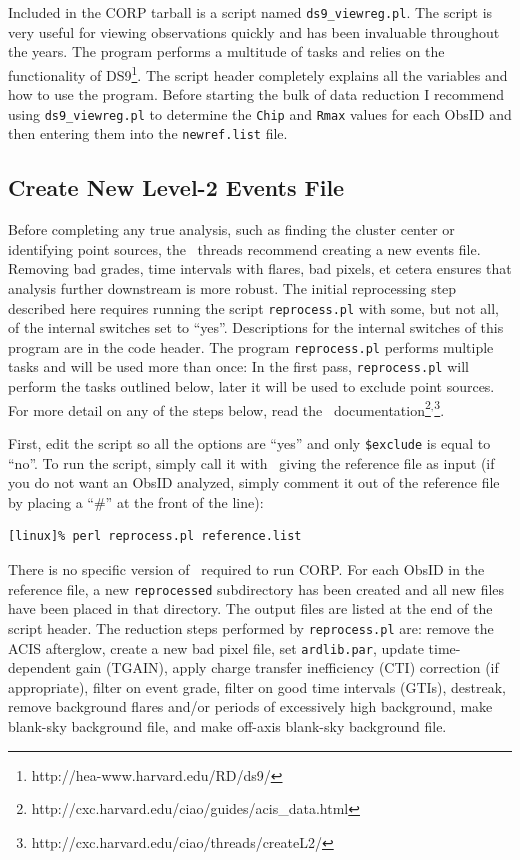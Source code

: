 Included in the CORP tarball is a script named
{\tt{ds9\_viewreg.pl}}. The script is very useful for viewing
observations quickly and has been invaluable throughout the years. The
program performs a multitude of tasks and relies on the functionality
of DS9\footnote{http://hea-www.harvard.edu/RD/ds9/}. The script header
completely explains all the variables and how to use the
program. Before starting the bulk of data reduction I recommend using
{\tt{ds9\_viewreg.pl}} to determine the {\tt{Chip}} and {\tt{Rmax}}
values for each ObsID and then entering them into the
{\tt{newref.list}} file.

\subsection{Create New Level-2 Events File}

Before completing any true analysis, such as finding the cluster
center or identifying point sources, the \ciao\ threads recommend
creating a new events file. Removing bad grades, time intervals with
flares, bad pixels, et cetera ensures that analysis further downstream
is more robust. The initial reprocessing step described here requires
running the script {\tt{reprocess.pl}} with some, but not all, of the
internal switches set to ``yes''. Descriptions for the internal
switches of this program are in the code header. The program
{\tt{reprocess.pl}} performs multiple tasks and will be used more than
once: In the first pass, {\tt{reprocess.pl}} will perform the tasks
outlined below, later it will be used to exclude point sources. For
more detail on any of the steps below, read the \ciao\
documentation\footnote{http://cxc.harvard.edu/ciao/guides/acis\_data.html}$^{,}$\footnote{http://cxc.harvard.edu/ciao/threads/createL2/}.

First, edit the script so all the options are ``yes'' and only
{\tt{\$exclude}} is equal to ``no''. To run the script, simply call it
with \perl\ giving the reference file as input (if you do not want an
ObsID analyzed, simply comment it out of the reference file by placing
a ``\#'' at the front of the line):
\begin{verbatim}
[linux]% perl reprocess.pl reference.list
\end{verbatim}
There is no specific version of \perl\ required to run CORP. For each
ObsID in the reference file, a new {\tt{reprocessed}} subdirectory has
been created and all new files have been placed in that directory. The
output files are listed at the end of the script header. The reduction
steps performed by {\tt{reprocess.pl}} are: remove the ACIS afterglow,
create a new bad pixel file, set {\tt{ardlib.par}}, update
time-dependent gain (TGAIN), apply charge transfer inefficiency (CTI)
correction (if appropriate), filter on event grade, filter on good
time intervals (GTIs), destreak, remove background flares and/or
periods of excessively high background, make blank-sky background
file, and make off-axis blank-sky background file.

